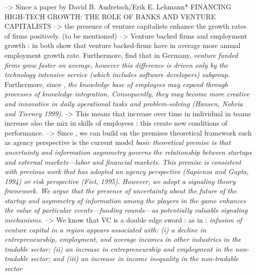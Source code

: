 \begin{itemize}
\begin{itemize}
\begin{itemize}
    --> Since a paper by David B. Audretsch/Erik E. Lehmann* FINANCING HIGH-TECH GROWTH: THE ROLE OF BANKS AND VENTURE CAPITALISTS --> the presence of venture capitalists enhance the growth rates of firms positively. (to be mentioned)
    --> Venture backed firms and employment growth : in \citep{davila2003venture, engel2007firm} both show that venture backed-firms have in average more annual employment growth rate. Furthermore, \citep{engel2007firm} find that in Germany, \textit{venture funded firms grow faster on average, however this difference is driven only by the technology intensive service (which includes software developers) subgroup.} Furthermore, since \citep{de2010interrelationships}, \textit{the knowledge base of employees may expand through processes of knowledge integration. Consequently, they may become more creative and innovative in daily operational tasks and problem-solving (Hansen, Nohria and Tierney 1999).} -> This means that increase over time in individual in teams increase also the mix in skills of employees : this create new conditions of performance.
    --> Since \citet{davila2003venture}, we can build on the premises theoretical framework such as agency perspective is the current model \textit{basic theoretical premise is that uncertainty and information asymmetry governs the relationship between startups and external markets—labor and financial markets. This premise is consistent with previous work that has adopted an agency perspective (Sapienza and Gupta, 1994) or risk perspective (Fiet, 1995). However, we adopt a signaling theory framework. We argue that the presence of uncertainty about the future of the startup and asymmetry of information among the players in the game enhances the value of particular events—funding rounds—as potentially valuable signaling mechanisms.}
    --> We know that VC is a double edge sword : as in \citet{sorenson2019silicon} : \textit{infusion of venture capital in a region appears associated with: (i) a decline in entrepreneurship, employment, and average incomes in other industries in the tradable sector; (ii) an increase in entrepreneurship and employment in the non-tradable sector; and (iii) an increase in income inequality in the non-tradable sector}

\end{itemize}
\end{itemize}
\end{itemize}
